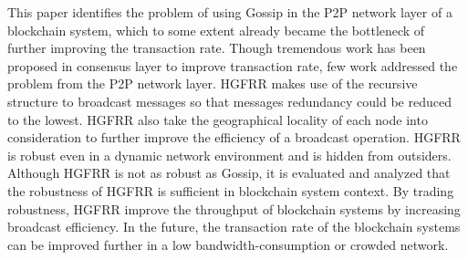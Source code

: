 This paper identifies the problem of using Gossip in the P2P network layer of a blockchain system, which to some extent already became the bottleneck of further improving the transaction rate. Though tremendous work has been proposed in consensus layer to improve transaction rate, few work addressed the problem from the P2P network layer. HGFRR makes use of the recursive structure to broadcast messages so that messages redundancy could be reduced to the lowest. HGFRR also take the geographical locality of each node into consideration to further improve the efficiency of a broadcast operation. HGFRR is robust even in a dynamic network environment and is hidden from outsiders. Although HGFRR is not as robust as Gossip, it is evaluated and analyzed that the robustness of HGFRR is sufficient in blockchain system context. By trading robustness, HGFRR improve the throughput of blockchain systems by increasing broadcast efficiency. In the future, the transaction rate of the blockchain systems can be improved further in a low bandwidth-consumption or crowded network.
